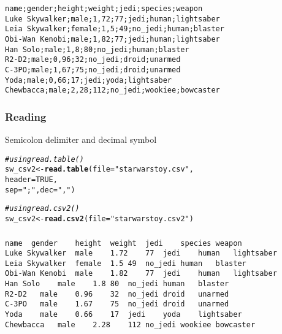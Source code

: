 \documentclass[12pt]{beamer}\usepackage[]{graphicx}\usepackage[]{color}
\makeatletter
\newcommand{\hlnum}[1]{\textcolor[rgb]{0.686,0.059,0.569}{#1}}%
\newcommand{\hlstr}[1]{\textcolor[rgb]{0.192,0.494,0.8}{#1}}%
\newcommand{\hlcom}[1]{\textcolor[rgb]{0.678,0.584,0.686}{\textit{#1}}}%
\newcommand{\hlstd}[1]{\textcolor[rgb]{0.345,0.345,0.345}{#1}}%
\newcommand{\hlkwb}[1]{\textcolor[rgb]{0.69,0.353,0.396}{#1}}%
\newcommand{\hlkwc}[1]{\textcolor[rgb]{0.333,0.667,0.333}{#1}}%
\newcommand{\hlkwd}[1]{\textcolor[rgb]{0.737,0.353,0.396}{\textbf{#1}}}%
\newenvironment{kframe}{%
 \def\at@end@of@kframe{}%
 \ifinner\ifhmode%
  \def\at@end@of@kframe{\end{minipage}}%
  \begin{minipage}{\columnwidth}%
 \fi\fi%
 \def\FrameCommand##1{\hskip\@totalleftmargin \hskip-\fboxsep
 \colorbox{shadecolor}{##1}\hskip-\fboxsep
     \hskip-\linewidth \hskip-\@totalleftmargin \hskip\columnwidth}%
 \MakeFramed {\advance\hsize-\width
   \@totalleftmargin\z@ \linewidth\hsize
   \@setminipage}}%
 {\par\unskip\endMakeFramed%
 \at@end@of@kframe}
\newenvironment{knitrout}{}{} %
\makeatother
\begin{document}

\begin{frame}[fragile]
\frametitle{}

{\small
\begin{verbatim}
name;gender;height;weight;jedi;species;weapon
Luke Skywalker;male;1,72;77;jedi;human;lightsaber
Leia Skywalker;female;1,5;49;no_jedi;human;blaster
Obi-Wan Kenobi;male;1,82;77;jedi;human;lightsaber
Han Solo;male;1,8;80;no_jedi;human;blaster
R2-D2;male;0,96;32;no_jedi;droid;unarmed
C-3PO;male;1,67;75;no_jedi;droid;unarmed
Yoda;male;0,66;17;jedi;yoda;lightsaber
Chewbacca;male;2,28;112;no_jedi;wookiee;bowcaster
\end{verbatim}
}

\end{frame}


\begin{frame}[fragile]
\frametitle{Reading }

Semicolon delimiter  and decimal symbol 

\begin{knitrout}\footnotesize
{}\color{fgcolor}\begin{kframe}
\begin{alltt}
\hlcom{# using read.table()}
\hlstd{sw_csv2} \hlkwb{<-} \hlkwd{read.table}\hlstd{(}\hlkwc{file} \hlstd{=} \hlstr{"starwarstoy.csv"}\hlstd{,}
                      \hlkwc{header} \hlstd{=} \hlnum{TRUE}\hlstd{,}
                      \hlkwc{sep} \hlstd{=} \hlstr{";"}\hlstd{,} \hlkwc{dec} \hlstd{=} \hlstr{","}\hlstd{)}

\hlcom{# using read.csv2()}
\hlstd{sw_csv2} \hlkwb{<-} \hlkwd{read.csv2}\hlstd{(}\hlkwc{file} \hlstd{=} \hlstr{"starwarstoy.csv2"}\hlstd{)}
\end{alltt}
\end{kframe}
\end{knitrout}

\end{frame}


\begin{frame}[fragile]
\frametitle{}

{\small
\begin{verbatim}
name  gender	height	weight	jedi	species	weapon
Luke Skywalker	male	1.72	77	jedi	human	lightsaber
Leia Skywalker	female	1.5	49	no_jedi	human	blaster
Obi-Wan Kenobi	male	1.82	77	jedi	human	lightsaber
Han Solo	male	1.8	80	no_jedi	human	blaster
R2-D2	male	0.96	32	no_jedi	droid	unarmed
C-3PO	male	1.67	75	no_jedi	droid	unarmed
Yoda	male	0.66	17	jedi	yoda	lightsaber
Chewbacca	male	2.28	112	no_jedi	wookiee	bowcaster
\end{verbatim}
}

\end{frame}
\end{document}
